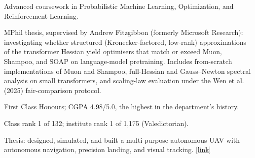 \begin{details}
    \item Advanced coursework in Probabilistic Machine Learning, Optimization, and Reinforcement Learning.
    \item MPhil thesis, supervised by Andrew Fitzgibbon (formerly Microsoft Research): investigating whether structured (Kronecker-factored, low-rank) approximations of the transformer Hessian yield optimisers that match or exceed Muon, Shampoo, and SOAP on language-model pretraining. Includes from-scratch implementations of Muon and Shampoo, full-Hessian and Gauss--Newton spectral analysis on small transformers, and scaling-law evaluation under the Wen et al. (2025) fair-comparison protocol.
\end{details}

\begin{details}
    \item First Class Honours; CGPA 4.98/5.0, the highest in the department's history.
    \item Class rank 1 of 132; institute rank 1 of 1{,}175 (Valedictorian).
    \item Thesis: designed, simulated, and built a multi-purpose autonomous UAV with autonomous navigation, precision landing, and visual tracking. \href{https://www.nelsonelijah.com/projects/autouav}{[link]}
\end{details}
